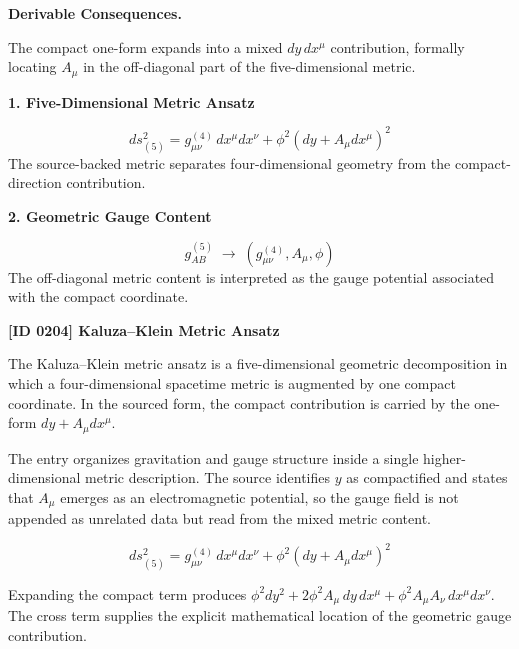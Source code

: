 \par\vspace{0.35em}
\noindent\textbf{Derivable Consequences.}\quad
\begingroup
\footnotesize
\raggedright
The compact one-form expands into a mixed \(dy\,dx^{\mu}\) contribution, formally locating \(A_{\mu}\) in the off-diagonal part of the five-dimensional metric.
\par\endgroup

\noindent\textbf{1. Five-Dimensional Metric Ansatz}\par
\[
ds^2_{(5)} = g^{(4)}_{\mu\nu}\,dx^{\mu}dx^{\nu} + \phi^2\!\left(dy + A_{\mu}dx^{\mu}\right)^2
\]
\noindent The source-backed metric separates four-dimensional geometry from the compact-direction contribution.\par
\noindent\textbf{2. Geometric Gauge Content}\par
\[
g^{(5)}_{AB}\;\longrightarrow\;\left(g^{(4)}_{\mu\nu},A_{\mu},\phi\right)
\]
\noindent The off-diagonal metric content is interpreted as the gauge potential associated with the compact coordinate.\par

\clearpage
\noindent\textbf{[ID 0204] Kaluza--Klein Metric Ansatz}\par
\vspace{0.35em}
\begingroup\small


The Kaluza--Klein metric ansatz is a five-dimensional geometric decomposition in which a four-dimensional spacetime metric is augmented by one compact coordinate. In the sourced form, the compact contribution is carried by the one-form \(dy+A_{\mu}dx^{\mu}\).


The entry organizes gravitation and gauge structure inside a single higher-dimensional metric description. The source identifies \(y\) as compactified and states that \(A_{\mu}\) emerges as an electromagnetic potential, so the gauge field is not appended as unrelated data but read from the mixed metric content.


\[
ds^2_{(5)}=g^{(4)}_{\mu\nu}\,dx^{\mu}dx^{\nu}+\phi^2\!\left(dy+A_{\mu}dx^{\mu}\right)^2
\]


Expanding the compact term produces \(\phi^2dy^2+2\phi^2A_{\mu}\,dy\,dx^{\mu}+\phi^2A_{\mu}A_{\nu}\,dx^{\mu}dx^{\nu}\). The cross term supplies the explicit mathematical location of the geometric gauge contribution.

